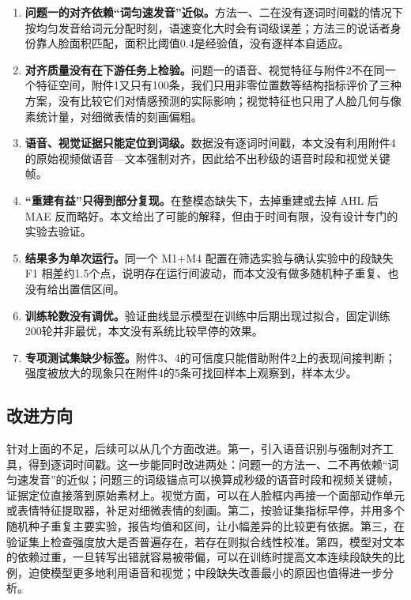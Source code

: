 \begin{enumerate}[label=\arabic*.]
\item \textbf{问题一的对齐依赖“词匀速发音”近似。}方法一、二在没有逐词时间戳的情况下按均匀发音给词元分配时刻，语速变化大时会有词级误差；方法三的说话者身份靠人脸面积匹配，面积比阈值0.4是经验值，没有逐样本自适应。
\item \textbf{对齐质量没有在下游任务上检验。}问题一的语音、视觉特征与附件2不在同一个特征空间，附件1又只有100条，我们只用非零位置数等结构指标评价了三种方案，没有比较它们对情感预测的实际影响；视觉特征也只用了人脸几何与像素统计量，对细微表情的刻画偏粗。
\item \textbf{语音、视觉证据只能定位到词级。}数据没有逐词时间戳，本文没有利用附件4的原始视频做语音—文本强制对齐，因此给不出秒级的语音时段和视觉关键帧。
\item \textbf{“重建有益”只得到部分复现。}在整模态缺失下，去掉重建或去掉 AHL 后 MAE 反而略好。本文给出了可能的解释，但由于时间有限，没有设计专门的实验去验证。
\item \textbf{结果多为单次运行。}同一个 M1+M4 配置在筛选实验与确认实验中的段缺失 F1 相差约1.5个点，说明存在运行间波动，而本文没有做多随机种子重复、也没有给出置信区间。
\item \textbf{训练轮数没有调优。}验证曲线显示模型在训练中后期出现过拟合，固定训练200轮并非最优，本文没有系统比较早停的效果。
\item \textbf{专项测试集缺少标签。}附件3、4的可信度只能借助附件2上的表现间接判断；强度被放大的现象只在附件4的5条可找回样本上观察到，样本太少。
\end{enumerate}

\subsection{改进方向}

针对上面的不足，后续可以从几个方面改进。第一，引入语音识别与强制对齐工具，得到逐词时间戳。这一步能同时改进两处：问题一的方法一、二不再依赖“词匀速发音”的近似；问题三的词级锚点可以换算成秒级的语音时段和视频关键帧，证据定位直接落到原始素材上。视觉方面，可以在人脸框内再接一个面部动作单元或表情特征提取器，补足对细微表情的刻画。第二，按验证集指标早停，并用多个随机种子重复主要实验，报告均值和区间，让小幅差异的比较更有依据。第三，在验证集上检查强度放大是否普遍存在，若存在则拟合线性校准。第四，模型对文本的依赖过重，一旦转写出错就容易被带偏，可以在训练时提高文本连续段缺失的比例，迫使模型更多地利用语音和视觉；中段缺失改善最小的原因也值得进一步分析。
